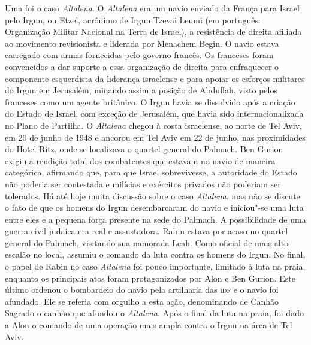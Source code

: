 Uma foi o caso \textit{Altalena}. O \textit{Altalena} era um navio enviado
da França para Israel pelo Irgun, ou Etzel, acrônimo de Irgun Tzevai
Leumi (em português: Organização Militar Nacional na Terra de Israel), 
a resistência de direita afiliada ao movimento revisionista e
liderada por Menachem Begin. O navio estava carregado com armas
fornecidas pelo governo francês. Os franceses foram convencidos a dar suporte a
essa organização de direita para enfraquecer o componente esquerdista da
liderança israelense e para apoiar os esforços militares do Irgun em
Jerusalém, minando assim a posição de Abdullah, visto pelos franceses
como um agente britânico. O Irgun havia se dissolvido após a criação do
Estado de Israel, com exceção de Jerusalém, que havia sido
internacionalizada no Plano de Partilha. O \textit{Altalena} chegou à
costa israelense, ao norte de Tel Aviv, em 20 de junho de 1948 e ancorou em Tel
Aviv em 22 de junho, nas proximidades do Hotel Ritz, onde se localizava o quartel
general do Palmach. Ben Gurion exigiu a rendição total dos combatentes
que estavam no navio de maneira categórica, afirmando que, para que Israel
sobrevivesse, a autoridade do Estado não poderia ser contestada e
milícias e exércitos privados não poderiam ser tolerados. Há até hoje
muita discussão sobre o caso \textit{Altalena}, mas não se discute o fato
de que os homens do Irgun desembarcaram do navio e iniciou"-se uma luta
entre eles e a pequena força presente na sede do Palmach. A
possibilidade de uma guerra civil judaica era real e assustadora. Rabin
estava por acaso no quartel general do Palmach, visitando sua namorada
Leah. Como oficial de mais alto escalão no local, assumiu o comando da
luta contra os homens do Irgun. No final, o papel de Rabin no caso
\textit{Altalena} foi pouco importante, limitado à luta na praia, enquanto
os principais atos foram protagonizados por Alon e Ben Gurion. Este último
ordenou o bombardeio do navio pela artilharia das \textsc{idf} e o navio foi
afundado. Ele se referia com orgulho a esta ação, denominando de Canhão
Sagrado o canhão que afundou o \textit{Altalena}. Após o final da luta na
praia, foi dado a Alon o comando de uma operação mais ampla contra o
Irgun na área de Tel Aviv.


